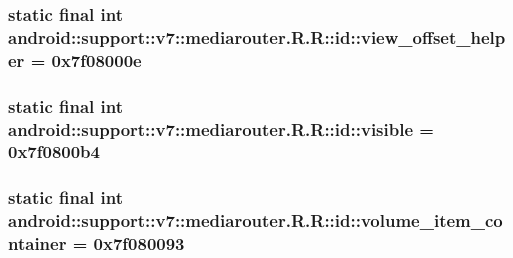 \hypertarget{classandroid_1_1support_1_1v7_1_1mediarouter_1_1_r_1_1id_27ce1bd14ea444662fe371a14bb3b607}{
\subsubsection[{view\_\-offset\_\-helper}]{\setlength{\rightskip}{0pt plus 5cm}static final int android::support::v7::mediarouter.R.R::id::view\_\-offset\_\-helper = 0x7f08000e}}
\label{classandroid_1_1support_1_1v7_1_1mediarouter_1_1_r_1_1id_27ce1bd14ea444662fe371a14bb3b607}


\hypertarget{classandroid_1_1support_1_1v7_1_1mediarouter_1_1_r_1_1id_08e96523a574b46675a292d318069acc}{
\subsubsection[{visible}]{\setlength{\rightskip}{0pt plus 5cm}static final int android::support::v7::mediarouter.R.R::id::visible = 0x7f0800b4}}
\label{classandroid_1_1support_1_1v7_1_1mediarouter_1_1_r_1_1id_08e96523a574b46675a292d318069acc}


\hypertarget{classandroid_1_1support_1_1v7_1_1mediarouter_1_1_r_1_1id_2e6c8718fd5b26bcb51ff56a49c6ab90}{
\subsubsection[{volume\_\-item\_\-container}]{\setlength{\rightskip}{0pt plus 5cm}static final int android::support::v7::mediarouter.R.R::id::volume\_\-item\_\-container = 0x7f080093}}
\label{classandroid_1_1support_1_1v7_1_1mediarouter_1_1_r_1_1id_2e6c8718fd5b26bcb51ff56a49c6ab90}


